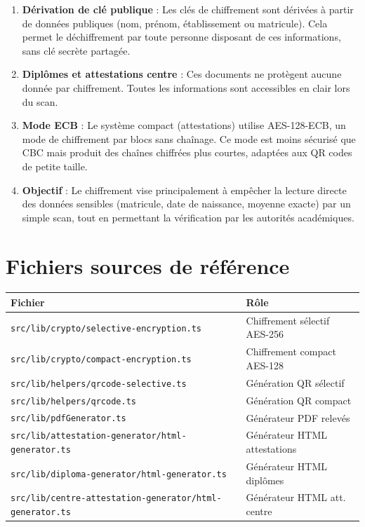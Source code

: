 \documentclass[a4paper,11pt]{article}
\begin{document}
\begin{tcolorbox}[colback=red!5, colframe=encryptedred, title={\textbf{Points importants}}]
\begin{enumerate}
    \item \textbf{D\'erivation de cl\'e publique} : Les cl\'es de chiffrement sont d\'eriv\'ees \`a partir de donn\'ees publiques (nom, pr\'enom, \'etablissement ou matricule). Cela permet le d\'echiffrement par toute personne disposant de ces informations, sans cl\'e secr\`ete partag\'ee.

    \item \textbf{Dipl\^omes et attestations centre} : Ces documents ne prot\`egent aucune donn\'ee par chiffrement. Toutes les informations sont accessibles en clair lors du scan.

    \item \textbf{Mode ECB} : Le syst\`eme compact (attestations) utilise AES-128-ECB, un mode de chiffrement par blocs sans cha\^inage. Ce mode est moins s\'ecuris\'e que CBC mais produit des cha\^ines chiffr\'ees plus courtes, adapt\'ees aux QR codes de petite taille.

    \item \textbf{Objectif} : Le chiffrement vise principalement \`a emp\^echer la lecture directe des donn\'ees sensibles (matricule, date de naissance, moyenne exacte) par un simple scan, tout en permettant la v\'erification par les autorit\'es acad\'emiques.
\end{enumerate}
\end{tcolorbox}

\section{Fichiers sources de r\'ef\'erence}

\begin{center}
\small
\begin{longtable}{p{7cm}p{6cm}}
\toprule
\textbf{Fichier} & \textbf{R\^ole} \\
\midrule
\texttt{src/lib/crypto/selective-encryption.ts} & Chiffrement s\'electif AES-256 \\
\texttt{src/lib/crypto/compact-encryption.ts} & Chiffrement compact AES-128 \\
\texttt{src/lib/helpers/qrcode-selective.ts} & G\'en\'eration QR s\'electif \\
\texttt{src/lib/helpers/qrcode.ts} & G\'en\'eration QR compact \\
\texttt{src/lib/pdfGenerator.ts} & G\'en\'erateur PDF relev\'es \\
\texttt{src/lib/attestation-generator/html-generator.ts} & G\'en\'erateur HTML attestations \\
\texttt{src/lib/diploma-generator/html-generator.ts} & G\'en\'erateur HTML dipl\^omes \\
\texttt{src/lib/centre-attestation-generator/html-generator.ts} & G\'en\'erateur HTML att. centre \\
\bottomrule
\end{longtable}
\end{center}
\end{document}
